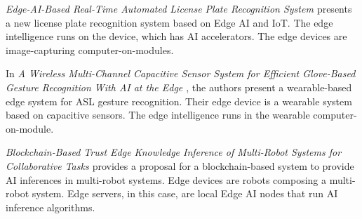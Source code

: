 
\textit{Edge-AI-Based Real-Time Automated License Plate Recognition System \cite{lin2022edge}} presents a new license plate recognition system based on Edge AI and IoT. The edge intelligence runs on the device, which has AI accelerators. The edge devices are image-capturing computer-on-modules.



In \textit{A Wireless Multi-Channel Capacitive Sensor System for Efficient Glove-Based Gesture Recognition With AI at the Edge \cite{pan2020wireless}}, the authors present a wearable-based edge system for ASL gesture recognition. Their edge device is a wearable system based on capacitive sensors. The edge intelligence runs in the wearable computer-on-module.



\textit{Blockchain-Based Trust Edge Knowledge Inference of Multi-Robot Systems for Collaborative Tasks \cite{li2021blockchain}} provides a proposal for a blockchain-based system to provide AI inferences in multi-robot systems. Edge devices are robots composing a multi-robot system. Edge servers, in this case, are local Edge AI nodes that run AI inference algorithms.


